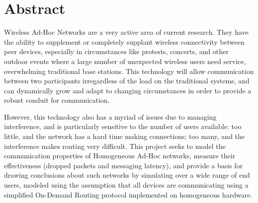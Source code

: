 \section{Abstract}
Wireless Ad-Hoc Networks are a very active area of current research.
They have the ability to supplement or completely supplant wireless connectivity between peer devices,
especially in circumstances like protests, concerts, and other outdoor events where a large number of
unexpected wireless users need service, overwhelming traditional base stations.
This technology will allow communication between two participants irregardless of the load on the
traditional systems, and can dynamically grow and adapt to changing circumstances in order to provide
a robust conduit for communication.

However, this technology also has a myriad of issues due to managing interference,
and is particularly sensitive to the number of users available: 
too little, and the network has a hard time making connections;
too many, and the interference makes routing very difficult.
This project seeks to model the communication properties of Homogeneous Ad-Hoc networks, 
measure their effectiveness (dropped packets and messaging latency),
and provide a basis for drawing conclusions about such networks 
by simulating over a wide range of end users, 
modeled using the assumption that all devices are communicating 
using a simplified On-Demand Routing protocol implemented on homogeneous hardware.
